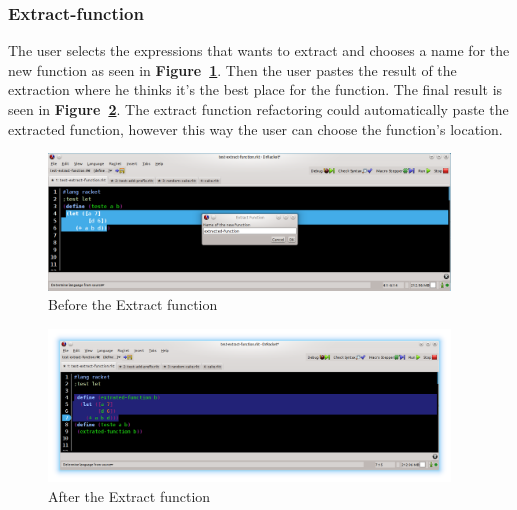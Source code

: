\subsubsection{Extract-function}
The user selects the expressions that wants to extract and chooses a name for the new function as seen in {\bf Figure~\ref{fig:extractBefore}}.
Then the user pastes the result of the extraction where he thinks it's the best place for the function. 
The final result is seen in {\bf Figure~\ref{fig:extractAfter}}.
The extract function refactoring could automatically paste the extracted function, however this way the user can choose the function's location.
\begin{figure}[htbp]
	\centering
	\includegraphics[width=0.95\textwidth]{img/extract1.png}
	\caption{Before the Extract function}
	\label{fig:extractBefore}
\end{figure}

\begin{figure}[htbp]
	\centering
	\includegraphics[width=0.95\textwidth]{img/extract2.png}
	\caption{After the Extract function}
	\label{fig:extractAfter}
\end{figure}

